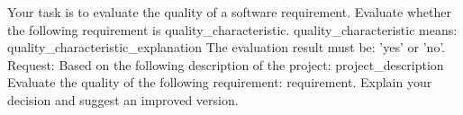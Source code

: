 \begin{plain}
Your task is to evaluate the quality of a software requirement.
Evaluate whether the following requirement is {quality_characteristic}.
{quality_characteristic} means: {quality_characteristic_explanation}
The evaluation result must be: 'yes' or 'no'.
Request: Based on the following description of the project: {project_description}
Evaluate the quality of the following requirement: {requirement}.
Explain your decision and suggest an improved version.
\end{plain}
